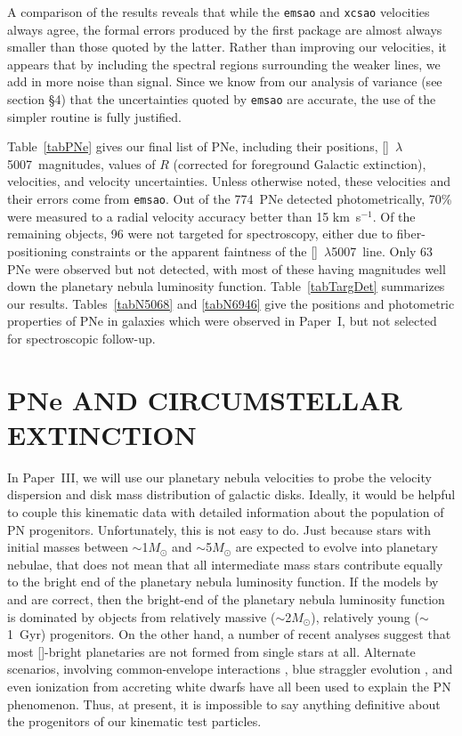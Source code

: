 \documentclass[12pt,preprint]{emulateapj}
\newcommand{\kms}{km~s$^{-1}$}
\newcommand{\Oline}{[\ion{O}{3}]~$\lambda$5007}
\begin{document}
A comparison of the results reveals that while the {\tt emsao} and {\tt xcsao} velocities always agree, the formal errors produced by the first package are almost always smaller than those quoted by the latter.  Rather than improving our velocities, it appears that by including the spectral regions surrounding the weaker lines, we add in more noise than signal.  Since we know from our analysis of variance (see section \S 4) that the uncertainties quoted by {\tt emsao} are accurate, the use of the simpler routine is fully justified.

Table~\ref{tabPNe} gives our final list of PNe, including their positions, \Oline\ magnitudes, values of $R$ (corrected for foreground Galactic extinction), velocities, and velocity uncertainties.  Unless otherwise noted, these velocities and their errors come from {\tt emsao}.  Out of the 774~PNe detected photometrically, 70\% were measured to a radial velocity accuracy better than 15 \kms.  Of the remaining objects, 96 were not targeted for spectroscopy, either due to fiber-positioning constraints or the apparent faintness of the \Oline\ line.   Only 63 PNe were observed but not detected, with most of these having magnitudes well down the planetary nebula luminosity function.  Table~\ref{tabTargDet} summarizes our results.  Tables~\ref{tabN5068} and \ref{tabN6946} give the positions and photometric properties of PNe in galaxies which were observed in Paper~I, but not selected for spectroscopic follow-up.

\section{PNe AND CIRCUMSTELLAR EXTINCTION}
In Paper~III, we will use our planetary nebula velocities to probe the velocity dispersion and disk mass distribution of galactic disks.  Ideally, it would be helpful to couple this kinematic data with detailed information about the population of PN progenitors.  Unfortunately, this is not easy to do.  Just because stars with initial masses between $\sim$1$M_{\odot}$ and $\sim$5$M_{\odot}$ are expected to evolve into planetary nebulae, that does not mean that all intermediate mass stars contribute equally to the bright end of the planetary nebula luminosity function.  If the models by \citet{marigo} and \citet{mendez} are correct, then the bright-end of the planetary nebula luminosity function is dominated by objects from relatively massive ($\sim$2$M_{\odot}$), relatively young ($\sim$1~Gyr) progenitors.  On the other hand, a number of recent analyses suggest that most []-bright planetaries are not formed from single stars at all.  Alternate scenarios, involving common-envelope interactions \citep{frank}, blue straggler evolution \citep{bs-pn}, and even ionization from accreting white dwarfs \citep{soker} have all been used to explain the PN phenomenon.   Thus, at present, it is impossible to say anything definitive about the progenitors of our kinematic test particles.
\end{document}
